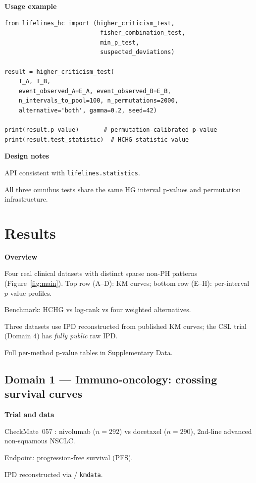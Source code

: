 \documentclass[unnumsec,webpdf,contemporary,large]{oup-authoring-template}
\let\origitemize\itemize
\let\origenditemize\enditemize
\renewenvironment{itemize}{%
  \origitemize
  \setlength{\itemsep}{1pt}%
  \setlength{\parskip}{0pt}%
  \setlength{\topsep}{3pt}%
}{\origenditemize}
\begin{document}
\textbf{Usage example}
\begin{lstlisting}
from lifelines_hc import (higher_criticism_test,
                           fisher_combination_test,
                           min_p_test,
                           suspected_deviations)

result = higher_criticism_test(
    T_A, T_B,
    event_observed_A=E_A, event_observed_B=E_B,
    n_intervals_to_pool=100, n_permutations=2000,
    alternative='both', gamma=0.2, seed=42)

print(result.p_value)       # permutation-calibrated p-value
print(result.test_statistic)  # HCHG statistic value
\end{lstlisting}

\textbf{Design notes}
\begin{itemize}
  \item API consistent with \texttt{lifelines.statistics}.
  \item All three omnibus tests share the same HG interval p-values and
        permutation infrastructure.
\end{itemize}


\section{Results}

\textbf{Overview}
\begin{itemize}
  \item Four real clinical datasets with distinct sparse non-PH patterns
        (Figure~\ref{fig:main}). Top row (A--D): KM curves;
        bottom row (E--H): per-interval $p$-value profiles.
  \item Benchmark: HCHG vs log-rank vs four weighted alternatives.
  \item Three datasets use IPD reconstructed from published KM curves;
        the CSL trial (Domain 4) has \emph{fully public} raw IPD.
  \item Full per-method p-value tables in Supplementary Data.
\end{itemize}

\subsection*{Domain 1 — Immuno-oncology: crossing survival curves}

\textbf{Trial and data}
\begin{itemize}
  \item CheckMate~057 \citep{borghaei2015}: nivolumab ($n=292$) vs
        docetaxel ($n=290$), 2nd-line advanced non-squamous NSCLC.
  \item Endpoint: progression-free survival (PFS).
  \item IPD reconstructed via \citet{guyot2012} / \texttt{kmdata}.
\end{itemize}
\end{document}
